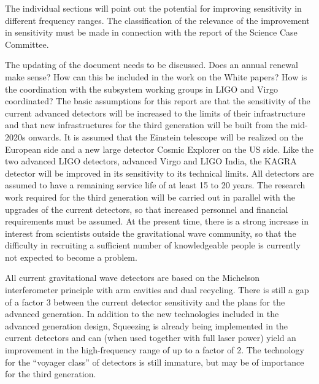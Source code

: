 The individual sections will point out the potential for improving sensitivity in different frequency ranges. The classification of the relevance of the improvement in sensitivity must be made in connection with the report of the Science Case Committee. 
\par
The updating of the document needs to be discussed. Does an annual renewal make sense? How can this be included in the work on the White papers? How is the coordination with the subsystem working groups in LIGO and Virgo coordinated? The basic assumptions for this report are that the sensitivity of the current advanced detectors will be increased to the limits of their infrastructure and that new infrastructures for the third generation will be built from the mid-2020s onwards. It is assumed that the Einstein telescope will be realized on the European side and a new large detector Cosmic Explorer on the US side. Like the two advanced LIGO detectors, advanced Virgo and LIGO India, the KAGRA detector will be improved in its sensitivity to its technical limits. All detectors are assumed to have a remaining service life of at least 15 to 20 years. The research work required for the third generation will be carried out in parallel with the upgrades of the current detectors, so that increased personnel and financial requirements must be assumed. At the present time, there is a strong increase in interest from scientists outside the gravitational wave community, so that the difficulty in recruiting a sufficient number of knowledgeable people is currently not expected to become a problem.

All current gravitational wave detectors are based on the Michelson interferometer principle with arm cavities and dual recycling.
There is still a gap of a factor 3 between the current detector sensitivity and the plans for the advanced generation. In addition to the new technologies included in the advanced generation design, Squeezing is already being implemented in the current detectors and can (when used together with full laser power) yield an improvement in the high-frequency range of up to a factor of 2. 
The technology for the ``voyager class'' of detectors is still immature, but may be of importance for the third generation.

